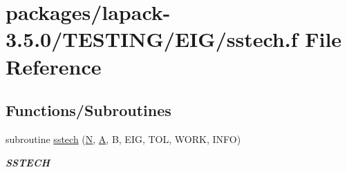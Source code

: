 \hypertarget{sstech_8f}{}\section{packages/lapack-\/3.5.0/\+T\+E\+S\+T\+I\+N\+G/\+E\+I\+G/sstech.f File Reference}
\label{sstech_8f}
\subsection*{Functions/\+Subroutines}
\begin{DoxyCompactItemize}
\item 
subroutine \hyperlink{group__single__eig_ga455b022ce67894011ee08a1a4b0eb1ad}{sstech} (\hyperlink{polmisc_8c_a0240ac851181b84ac374872dc5434ee4}{N}, \hyperlink{classA}{A}, B, E\+I\+G, T\+O\+L, W\+O\+R\+K, I\+N\+F\+O)
\begin{DoxyCompactList}\small\item\em {\bfseries S\+S\+T\+E\+C\+H} \end{DoxyCompactList}\end{DoxyCompactItemize}
